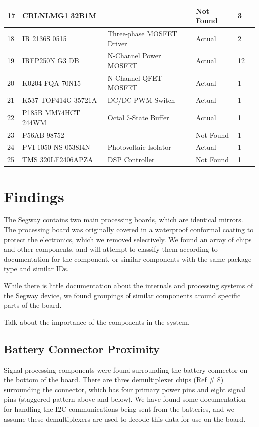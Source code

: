 \documentclass[]{formalLabReport}
\begin{document}
\begin{center}
\begin{table}[]
\begin{tabular}{|l|l|l|l|l|l|}
        17    & CRLNLMG1 32B1M      &                            & Not Found     & 3        \\ \hline
        18    & IR 2136S 0515       & Three-phase MOSFET Driver  & Actual        & 2        \\ \hline
        19    & IRFP250N G3 DB      & N-Channel Power MOSFET     & Actual        & 12       \\ \hline
        20    & K0204 FQA 70N15     & N-Channel QFET MOSFET      & Actual        & 1        \\ \hline
        21    & K537 TOP414G 35721A & DC/DC PWM Switch           & Actual        & 1        \\ \hline
        22    & P185B MM74HCT 244WM & Octal 3-State Buffer       & Actual        & 1        \\ \hline
        23    & P56AB 98752         &                            & Not Found     & 1        \\ \hline
        24    & PVI 1050 NS 0538I4N & Photovoltaic Isolator      & Actual        & 1        \\ \hline
        25    & TMS 320LF2406APZA   & DSP Controller             & Not Found     & 1        \\ \hline
        \end{tabular}
    \end{table}
\end{center}

\section{Findings}
The Segway contains two main processing boards, which are identical mirrors. The processing board was
originally covered in a waterproof conformal coating to protect the electronics, which we removed selectively.
We found an array of chips and other components, and will attempt to classify them according to 
documentation for the component, or similar components with the same package type and similar IDs. 

While there is little documentation about the internals and processing systems of the Segway device, we found
groupings of similar components around specific parts of the board.

Talk about the importance of the components in the system.

\subsection{Battery Connector Proximity}
Signal processing components were found surrounding the battery connector on the bottom of the board.
There are three demultiplexer chips (Ref \# 8) surrounding the connector, which has four primary power pins
and eight signal pins (staggered pattern above and below). We have found some documentation for handling the
I2C communications being sent from the batteries, and we assume these demultiplexers are used to decode this
data for use on the board.
\end{document}
